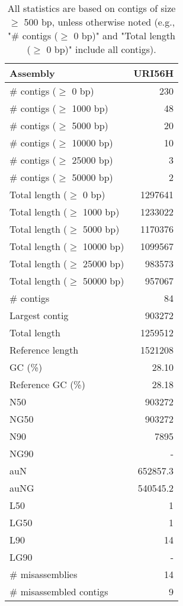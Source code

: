 \documentclass[12pt,a4paper]{article}
\begin{document}
\begin{table}[ht]
\begin{center}
\caption{All statistics are based on contigs of size $\geq$ 500 bp, unless otherwise noted (e.g., "\# contigs ($\geq$ 0 bp)" and "Total length ($\geq$ 0 bp)" include all contigs).}
\begin{tabular}{|l*{1}{|r}|}
\hline
Assembly & URI56H \\ \hline
\# contigs ($\geq$ 0 bp) & 230 \\ \hline
\# contigs ($\geq$ 1000 bp) & 48 \\ \hline
\# contigs ($\geq$ 5000 bp) & 20 \\ \hline
\# contigs ($\geq$ 10000 bp) & 10 \\ \hline
\# contigs ($\geq$ 25000 bp) & 3 \\ \hline
\# contigs ($\geq$ 50000 bp) & 2 \\ \hline
Total length ($\geq$ 0 bp) & 1297641 \\ \hline
Total length ($\geq$ 1000 bp) & 1233022 \\ \hline
Total length ($\geq$ 5000 bp) & 1170376 \\ \hline
Total length ($\geq$ 10000 bp) & 1099567 \\ \hline
Total length ($\geq$ 25000 bp) & 983573 \\ \hline
Total length ($\geq$ 50000 bp) & 957067 \\ \hline
\# contigs & 84 \\ \hline
Largest contig & 903272 \\ \hline
Total length & 1259512 \\ \hline
Reference length & 1521208 \\ \hline
GC (\%) & 28.10 \\ \hline
Reference GC (\%) & 28.18 \\ \hline
N50 & 903272 \\ \hline
NG50 & 903272 \\ \hline
N90 & 7895 \\ \hline
NG90 & - \\ \hline
auN & 652857.3 \\ \hline
auNG & 540545.2 \\ \hline
L50 & 1 \\ \hline
LG50 & 1 \\ \hline
L90 & 14 \\ \hline
LG90 & - \\ \hline
\# misassemblies & 14 \\ \hline
\# misassembled contigs & 9 \\ \hline

\end{tabular}
\end{center}
\end{table}
\end{document}
